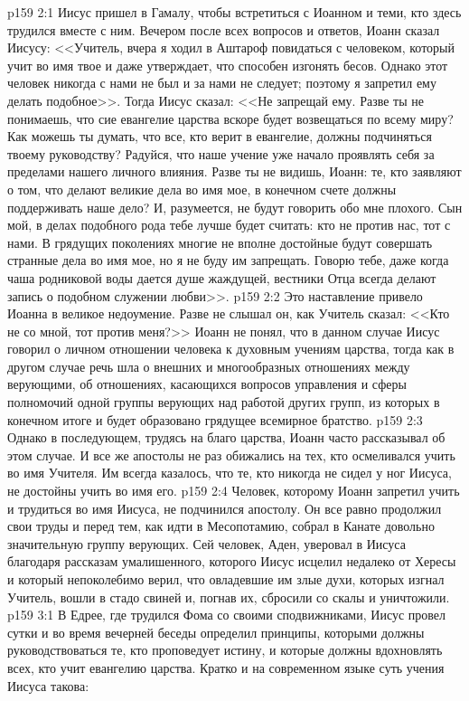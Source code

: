 \vs p159 2:1 Иисус пришел в Гамалу, чтобы встретиться с Иоанном и теми, кто здесь трудился вместе с ним. Вечером после всех вопросов и ответов, Иоанн сказал Иисусу: <<Учитель, вчера я ходил в Аштароф повидаться с человеком, который учит во имя твое и даже утверждает, что способен изгонять бесов. Однако этот человек никогда с нами не был и за нами не следует; поэтому я запретил ему делать подобное>>. Тогда Иисус сказал: <<Не запрещай ему. Разве ты не понимаешь, что сие евангелие царства вскоре будет возвещаться по всему миру? Как можешь ты думать, что все, кто верит в евангелие, должны подчиняться твоему руководству? Радуйся, что наше учение уже начало проявлять себя за пределами нашего личного влияния. Разве ты не видишь, Иоанн: те, кто заявляют о том, что делают великие дела во имя мое, в конечном счете должны поддерживать наше дело? И, разумеется, не будут говорить обо мне плохого. Сын мой, в делах подобного рода тебе лучше будет считать: кто не против нас, тот с нами. В грядущих поколениях многие не вполне достойные будут совершать странные дела во имя мое, но я не буду им запрещать. Говорю тебе, даже когда чаша родниковой воды дается душе жаждущей, вестники Отца всегда делают запись о подобном служении любви>>.
\vs p159 2:2 Это наставление привело Иоанна в великое недоумение. Разве не слышал он, как Учитель сказал: <<Кто не со мной, тот против меня?>> Иоанн не понял, что в данном случае Иисус говорил о личном отношении человека к духовным учениям царства, тогда как в другом случае речь шла о внешних и многообразных отношениях между верующими, об отношениях, касающихся вопросов управления и сферы полномочий одной группы верующих над работой других групп, из которых в конечном итоге и будет образовано грядущее всемирное братство.
\vs p159 2:3 Однако в последующем, трудясь на благо царства, Иоанн часто рассказывал об этом случае. И все же апостолы не раз обижались на тех, кто осмеливался учить во имя Учителя. Им всегда казалось, что те, кто никогда не сидел у ног Иисуса, не достойны учить во имя его.
\vs p159 2:4 Человек, которому Иоанн запретил учить и трудиться во имя Иисуса, не подчинился апостолу. Он все равно продолжил свои труды и перед тем, как идти в Месопотамию, собрал в Канате довольно значительную группу верующих. Сей человек, Аден, уверовал в Иисуса благодаря рассказам умалишенного, которого Иисус исцелил недалеко от Хересы и который непоколебимо верил, что овладевшие им злые духи, которых изгнал Учитель, вошли в стадо свиней и, погнав их, сбросили со скалы и уничтожили.
\vs p159 3:1 В Едрее, где трудился Фома со своими сподвижниками, Иисус провел сутки и во время вечерней беседы определил принципы, которыми должны руководствоваться те, кто проповедует истину, и которые должны вдохновлять всех, кто учит евангелию царства. Кратко и на современном языке суть учения Иисуса такова:
